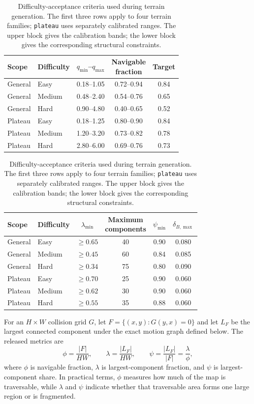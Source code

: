 \documentclass[11pt]{article}
\begin{document}
\begin{table}[htbp]
  \centering
  \caption{Difficulty-acceptance criteria used during terrain generation. The
  first three rows apply to four terrain families; \texttt{plateau} uses
  separately calibrated ranges. The upper block gives the calibration bands;
  the lower block gives the corresponding structural constraints.}
  \label{tab:difficulty-acceptance}
  \small
  \setlength{\tabcolsep}{5pt}
  \begin{tabular}{llccc}
    \toprule
    Scope & Difficulty & $q_{\min}$--$q_{\max}$ &
    \shortstack{Navigable\\fraction} & Target \\
    \midrule
    General & Easy   & 0.18--1.05 & 0.72--0.94 & 0.84 \\
    General & Medium & 0.48--2.40 & 0.54--0.76 & 0.65 \\
    General & Hard   & 0.90--4.80 & 0.40--0.65 & 0.52 \\
    Plateau & Easy   & 0.18--1.25 & 0.80--0.90 & 0.84 \\
    Plateau & Medium & 1.20--3.20 & 0.73--0.82 & 0.78 \\
    Plateau & Hard   & 2.80--6.00 & 0.69--0.76 & 0.73 \\
    \bottomrule
  \end{tabular}

  \medskip
  \begin{tabular}{llcccc}
    \toprule
    Scope & Difficulty & $\lambda_{\min}$ &
    \shortstack{Maximum\\components} & $\psi_{\min}$ &
    $\delta_{B,\max}$ \\
    \midrule
    General & Easy   & $\geq0.65$ & 40 & 0.90 & 0.080 \\
    General & Medium & $\geq0.45$ & 60 & 0.84 & 0.085 \\
    General & Hard   & $\geq0.34$ & 75 & 0.80 & 0.090 \\
    Plateau & Easy   & $\geq0.70$ & 25 & 0.90 & 0.060 \\
    Plateau & Medium & $\geq0.62$ & 30 & 0.90 & 0.060 \\
    Plateau & Hard   & $\geq0.55$ & 35 & 0.88 & 0.060 \\
    \bottomrule
  \end{tabular}
\end{table}

For an $H\times W$ collision grid $G$, let
$F=\{(x,y):G(y,x)=0\}$ and let $L_F$ be the largest connected component under
the exact motion graph defined below. The released metrics are
\begin{equation}
  \phi=\frac{|F|}{HW},\qquad
  \lambda=\frac{|L_F|}{HW},\qquad
  \psi=\frac{|L_F|}{|F|}=\frac{\lambda}{\phi},
\end{equation}
where $\phi$ is navigable fraction, $\lambda$ is largest-component fraction,
and $\psi$ is largest-component share. In practical terms, $\phi$ measures how
much of the map is traversable, while $\lambda$ and $\psi$ indicate whether
that traversable area forms one large region or is fragmented.
\end{document}
